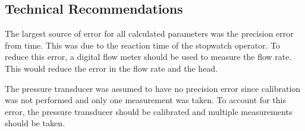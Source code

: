 \subsection{Technical Recommendations}
The largest source of error for all calculated parameters was the precision error from time. This was due to the reaction time of the stopwatch operator. To reduce this error, a digital flow meter should be used to measure the flow rate. This would reduce the error in the flow rate and the head.

The pressure transducer was assumed to have no precision error since calibration was not performed and only one measurement was taken. To account for this error, the pressure transducer should be calibrated and multiple measurements should be taken.
